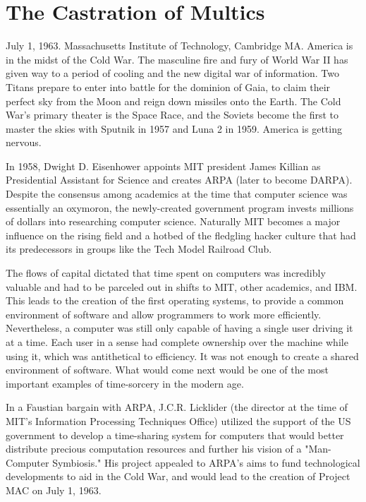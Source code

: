 \documentclass[10pt, statementpaper, twoside, openright]{memoir}
\begin{document}
\frontmatter
\pagestyle{simple}

\tableofcontents*

\mainmatter

\chapter{The Castration of Multics}

July 1, 1963. Massachusetts Institute of Technology, Cambridge MA. America is in the midst of the Cold War. The masculine fire and fury of World War II has given way to a period of cooling and the new digital war of information. Two Titans prepare to enter into battle for the dominion of Gaia, to claim their perfect sky from the Moon and reign down missiles onto the Earth. The Cold War's primary theater is the Space Race, and the Soviets become the first to master the skies with Sputnik in 1957 and Luna 2 in 1959. America is getting nervous.

In 1958, Dwight D. Eisenhower appoints MIT president James Killian as Presidential Assistant for Science and creates ARPA (later to become DARPA). Despite the consensus among academics at the time that computer science was essentially an oxymoron, the newly-created government program invests millions of dollars into researching computer science. Naturally MIT becomes a major influence on the rising field and a hotbed of the fledgling hacker culture that had its predecessors in groups like the Tech Model Railroad Club.

The flows of capital dictated that time spent on computers was incredibly valuable and had to be parceled out in shifts to MIT, other academics, and IBM. This leads to the creation of the first operating systems, to provide a common environment of software and allow programmers to work more efficiently. Nevertheless, a computer was still only capable of having a single user driving it at a time. Each user in a sense had complete ownership over the machine while using it, which was antithetical to efficiency. It was not enough to create a shared environment of software. What would come next would be one of the most important examples of time-sorcery in the modern age.

In a Faustian bargain with ARPA, J.C.R. Licklider (the director at the time of MIT's Information Processing Techniques Office) utilized the support of the US government to develop a time-sharing system for computers that would better distribute precious computation resources and further his vision of a "Man-Computer Symbiosis." His project appealed to ARPA's aims to fund technological developments to aid in the Cold War, and would lead to the creation of Project MAC on July 1, 1963.
\end{document}
